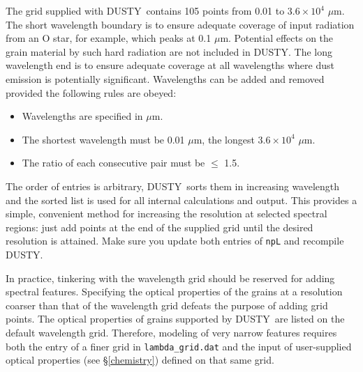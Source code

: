 \documentclass[11pt]{article}
\def\D    {{\sf DUSTY}}
\def\mic    {\hbox{$\mu$m}}
\begin{document}
The grid supplied with \D\ contains 105 points from 0.01 to
$3.6\times10^{4}$ \mic.  The short wavelength boundary is to ensure
adequate coverage of input radiation from an O star, for example,
which peaks at 0.1 \mic.  Potential effects on the grain material by
such hard radiation are not included in \D.  The long wavelength end
is to ensure adequate coverage at all wavelengths where dust emission
is potentially significant. Wavelengths can be added and removed
provided the following rules are obeyed:
\begin{itemize}
\item Wavelengths are specified in \mic.
\item The shortest wavelength must be 0.01 \mic, the longest
  $3.6\times10^{4}$ \mic.
\item The ratio of each consecutive pair must be $\le$ 1.5.
\end{itemize}
The order of entries is arbitrary, \D\ sorts them in increasing
wavelength and the sorted list is used for all internal calculations
and output.  This provides a simple, convenient method for increasing
the resolution at selected spectral regions: just add points at the
end of the supplied grid until the desired resolution is attained.
Make sure you update both entries of {\tt npL} and recompile \D.

In practice, tinkering with the wavelength grid should be reserved for
adding spectral features. Specifying the optical properties of the
grains at a resolution coarser than that of the wavelength grid
defeats the purpose of adding grid points. The optical properties of
grains supported by \D\ are listed on the default wavelength grid.
Therefore, modeling of very narrow features requires both the entry of
a finer grid in {\tt lambda\_grid.dat} and the input of user-supplied
optical properties (see \S\ref{chemistry}) defined on that same grid.


\end{document}
